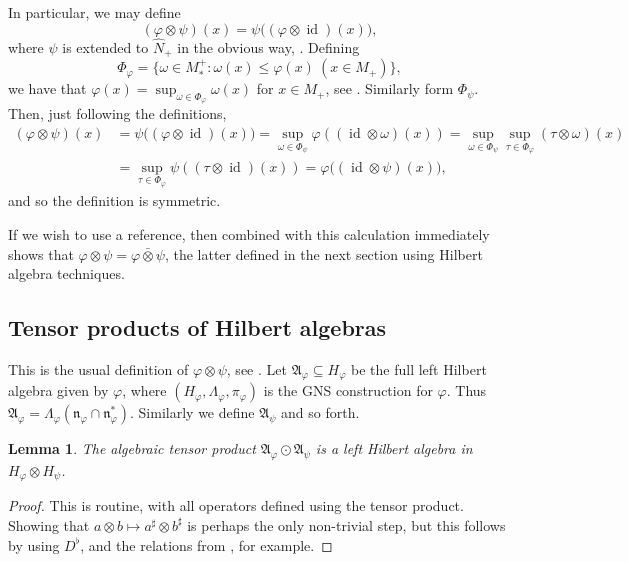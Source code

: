 \documentclass[a4paper,11pt]{article}
\theoremstyle{plain}
\newtheorem{lemma}[proposition]{Lemma}
\theoremstyle{remark}
\newcommand{\mf}[1]{\mathfrak{#1}}
\newcommand{\id}{\operatorname{id}}
\newcommand{\vnten}{\bar\otimes}
\newcommand{\hh}{\widehat}
\begin{document}
In particular, we may define
\[ (\varphi\otimes\psi)(x) = \psi\big( (\varphi\otimes\id)(x) \big), \]
where $\psi$ is extended to $\hh N_+$ in the obvious way, \cite[Corollary~IX.4.9]{TakesakiII}.  Defining
\[ \Phi_\varphi = \{ \omega\in M_*^+ : \omega(x) \leq \varphi(x) \ (x\in M_+) \}, \]
we have that $\varphi(x) = \sup_{\omega\in\Phi_\varphi} \omega(x)$ for $x\in M_+$, see \cite[Theorem~VII.1.11]{TakesakiII}.  Similarly form $\Phi_\psi$.  Then, just following the definitions,
\begin{align*}
(\varphi\otimes\psi)(x)
&= \psi\big( (\varphi\otimes\id)(x) \big)
= \sup_{\omega\in\Phi_\psi} \varphi((\id\otimes\omega)(x))
= \sup_{\omega\in\Phi_\psi} \sup_{\tau\in\Phi_\varphi} (\tau\otimes\omega)(x) \\
&= \sup_{\tau\in\Phi_\varphi} \psi( (\tau\otimes\id)(x) )
= \varphi\big( (\id\otimes\psi)(x) \big),
\end{align*}
and so the definition is symmetric.

If we wish to use a reference, then \cite[Proposition~8.3]{Stratila_ModTheoryBook} combined with this calculation immediately shows that $\varphi\otimes\psi = \varphi\vnten\psi$, the latter defined in the next section using Hilbert algebra techniques.


\subsection{Tensor products of Hilbert algebras}

This is the usual definition of $\varphi\otimes\psi$, see \cite[Definition~VIII.4.2]{TakesakiII}.  Let $\mf A_\varphi \subseteq H_\varphi$ be the full left Hilbert algebra given by $\varphi$, where $(H_\varphi, \Lambda_\varphi, \pi_\varphi)$ is the GNS construction for $\varphi$.  Thus $\mf A_\varphi = \Lambda_\varphi(\mf n_\varphi \cap \mf n_\varphi^*)$.  Similarly we define $\mf A_\psi$ and so forth.

\begin{lemma}
The algebraic tensor product $\mf A_\varphi \odot \mf A_\psi$ is a left Hilbert algebra in $H_\varphi \otimes H_\psi$.
\end{lemma}
\begin{proof}
This is routine, with all operators defined using the tensor product.  Showing that $a\otimes b \mapsto a^\sharp \otimes b^\sharp$ is perhaps the only non-trivial step, but this follows by using $D^\flat$, and the relations from \cite[Lemma~VI.1.5]{TakesakiII}, for example.
\end{proof}
\end{document}
